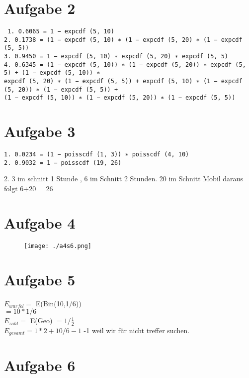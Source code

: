 \documentclass[a4paper,10pt]{scrbook}
\begin{document}
\section*{Aufgabe 2}
\begin{verbatim}
 1. 0.6065 = 1 − expcdf (5, 10)
2. 0.1738 = (1 − expcdf (5, 10) ∗ (1 − expcdf (5, 20) ∗ (1 − expcdf (5, 5))
3. 0.9450 = 1 − expcdf (5, 10) ∗ expcdf (5, 20) ∗ expcdf (5, 5)
4. 0.6345 = (1 − expcdf (5, 10)) ∗ (1 − expcdf (5, 20)) ∗ expcdf (5, 5) + (1 − expcdf (5, 10)) ∗
expcdf (5, 20) ∗ (1 − expcdf (5, 5)) + expcdf (5, 10) ∗ (1 − expcdf (5, 20)) ∗ (1 − expcdf (5, 5)) +
(1 − expcdf (5, 10)) ∗ (1 − expcdf (5, 20)) ∗ (1 − expcdf (5, 5))
\end{verbatim}

\section*{Aufgabe 3}
\begin{verbatim}
1. 0.0234 = (1 − poisscdf (1, 3)) ∗ poisscdf (4, 10)
2. 0.9032 = 1 − poisscdf (19, 26)
\end{verbatim}
2. 3 im schnitt 1 Stunde , 6 im Schnitt 2 Stunden. 20 im Schnitt Mobil daraus folgt 6+20 = 26

\section*{Aufgabe 4}
\begin{figure}[h]
 \centering
 \texttt{[image: ./a4s6.png]}
\end{figure}

\section*{Aufgabe 5}
$ E_{wurfel} =$ E(Bin(10,1/6))  \\
$ = 10*1/6$ \\
$ E_{zahl} = $ E(Geo) $ = 1/\frac{1}{2}$ \\
$E_{gesamt} = 1*2 + 10/6 -1 $ -1 weil wir für nicht treffer suchen.


\section*{Aufgabe 6}
\end{document}
